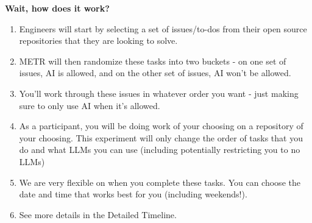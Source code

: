 \documentclass{article}
\begin{document}
\begin{instructionbox}
\textbf{Wait, how does it work?}

\begin{enumerate}
    \item Engineers will start by selecting a set of issues/to-dos from their open source repositories that they are looking to solve. 
    \item METR will then randomize these tasks into two buckets - on one set of issues, AI is allowed, and on the other set of issues, AI won’t be allowed. 
    \item You’ll work through these issues in whatever order you want - just making sure to only use AI when it’s allowed.
    \item As a participant, you will be doing work of your choosing on a repository of your choosing. This experiment will only change the order of tasks that you do and what LLMs you can use (including potentially restricting you to no LLMs)
    \item We are very flexible on when you complete these tasks. You can choose the date and time that works best for you (including weekends!).
    \item See more details in the Detailed Timeline.
\end{enumerate}


\end{instructionbox}
\end{document}
